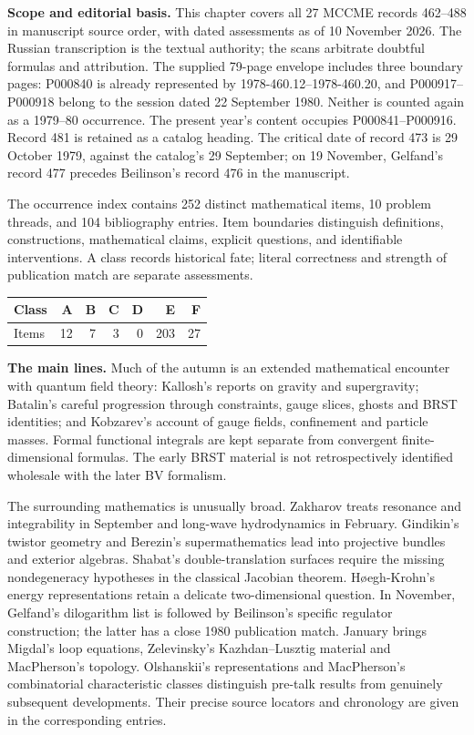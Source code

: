 \noindent\textbf{Scope and editorial basis.}
This chapter covers all 27 MCCME records 462--488 in manuscript source order, with
dated assessments as of 10 November 2026. The Russian transcription is the textual
authority; the scans arbitrate doubtful formulas and attribution. The supplied
79-page envelope includes three boundary pages: P000840 is already represented by
1978-460.12--1978-460.20, and P000917--P000918 belong to the session dated
22 September 1980. Neither is counted again as a 1979--80 occurrence. The present
year's content occupies P000841--P000916. Record 481 is retained as a catalog
heading. The critical date of record 473 is 29 October 1979, against the catalog's
29 September; on 19 November, Gelfand's record 477 precedes Beilinson's record 476
in the manuscript.

The occurrence index contains 252 distinct mathematical items, 10
problem threads, and 104 bibliography entries. Item boundaries distinguish
definitions, constructions, mathematical claims, explicit questions, and identifiable
interventions. A class records historical fate; literal correctness and strength of
publication match are separate assessments.
\begin{center}
\begin{tabular}{lrrrrrr}
\toprule
Class & A & B & C & D & E & F\\
\midrule
Items & 12 & 7 & 3 & 0 & 203 & 27\\
\bottomrule
\end{tabular}
\end{center}

\noindent\textbf{The main lines.}
Much of the autumn is an extended mathematical encounter with quantum field theory:
Kallosh's reports on gravity and supergravity; Batalin's careful progression through
constraints, gauge slices, ghosts and BRST identities; and Kobzarev's account of
gauge fields, confinement and particle masses. Formal functional integrals are kept
separate from convergent finite-dimensional formulas. The early BRST material is
not retrospectively identified wholesale with the later BV formalism.

The surrounding mathematics is unusually broad. Zakharov treats resonance and
integrability in September and long-wave hydrodynamics in February. Gindikin's
twistor geometry and Berezin's supermathematics lead into projective bundles and
exterior algebras. Shabat's double-translation surfaces require the missing
nondegeneracy hypotheses in the classical Jacobian theorem. H\o egh-Krohn's energy
representations retain a delicate two-dimensional question. In November, Gelfand's
dilogarithm list is followed by Beilinson's specific regulator construction; the
latter has a close 1980 publication match. January brings Migdal's loop equations,
Zelevinsky's Kazhdan--Lusztig material and MacPherson's topology. Olshanskii's
representations and MacPherson's combinatorial characteristic classes distinguish
pre-talk results from genuinely subsequent developments. Their precise source
locators and chronology are given in the corresponding entries.

